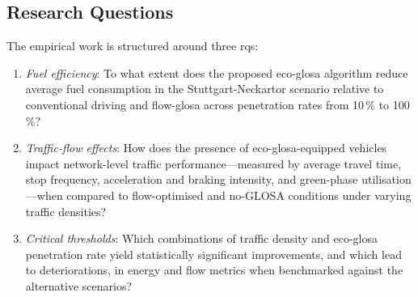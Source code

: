 \subsection{Research Questions}
\label{subsec:Research_Questions}
The empirical work is structured around three \acp{rq}:
\begin{enumerate}[label=RQ\arabic*, ref=RQ\arabic*]
  \item \label{rq1} \emph{Fuel efficiency}: To what extent does the proposed \ac{eco-glosa} algorithm reduce average fuel consumption in the Stuttgart-Neckartor scenario relative to conventional driving and \ac{flow-glosa} across penetration rates from 10\,\% to 100\,\%?
  \item \label{rq2} \emph{Traffic-flow effects}: How does the presence of \ac{eco-glosa}-equipped vehicles impact network-level traffic performance—measured by average travel time, stop frequency, acceleration and braking intensity, and green-phase utilisation—when compared to flow-optimised and no-GLOSA conditions under varying traffic densities?
  \item \label{rq3} \emph{Critical thresholds}: Which combinations of traffic density and \ac{eco-glosa} penetration rate yield statistically significant improvements, and which lead to deteriorations, in energy and flow metrics when benchmarked against the alternative scenarios?
\end{enumerate}